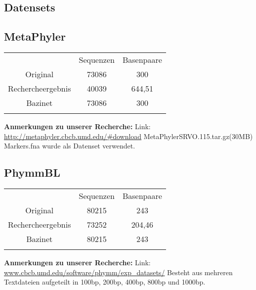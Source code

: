 \documentclass[a4paper, 11pt]{scrartcl}
\begin{document}
\begin{flushleft}


\section{Datensets}


\subsection{MetaPhyler}

\begin{tabular}{ccc}
& Sequenzen & Basenpaare \\
Original&73086&300\\
Rechercheergebnis&40039&644,51\\
Bazinet&73086&300\\
&&\\
\end{tabular}
\linebreak
\color{red}
\textbf{Anmerkungen zu unserer Recherche:}\linebreak
Link: \url{http://metaphyler.cbcb.umd.edu/#download}
\linebreak
MetaPhylerSRVO.115.tar.gz(30MB)
\linebreak
Markers.fna wurde als Datenset verwendet.
\color{black}
\subsection{PhymmBL}

\begin{tabular}{ccc}
& Sequenzen & Basenpaare \\
Original&80215&243\\
Rechercheergebnis&73252&204,46\\
Bazinet&80215&243\\
&&\\
\end{tabular}
\linebreak
\color{red}
\textbf{Anmerkungen zu unserer Recherche:}\linebreak
Link: \url{www.cbcb.umd.edu/software/phymm/exp_datasets/}
\linebreak
Besteht aus mehreren Textdateien aufgeteilt in 100bp, 200bp, 400bp, 800bp und 1000bp.
\color{black}


\end{flushleft}
\end{document}
